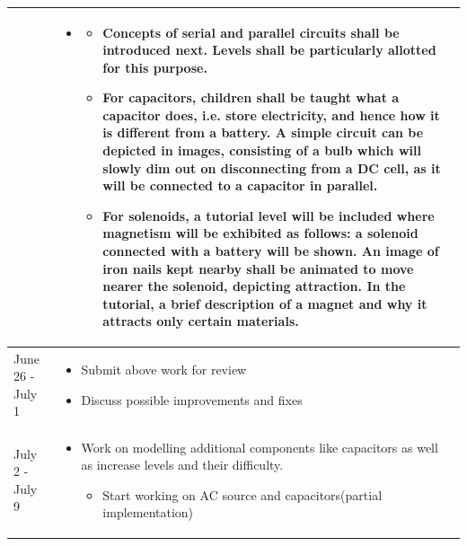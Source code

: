 \documentclass[preprint,12pt]{elsarticle}
\begin{document}
\begin{center}
\begin{tabularx}{\linewidth}{|l|X|}
  & \par
\parbox{12cm}{
\begin{itemize}[noitemsep, topsep=2pt]
	\item[] 
	\begin{itemize}[noitemsep, topsep=2pt]
		
		\item Concepts of serial and parallel circuits shall be introduced next. Levels shall be particularly allotted for this purpose.
		
		\item For capacitors, children shall be taught what a capacitor does, i.e. store electricity, and hence how it is different from  a battery. A simple circuit can be depicted in images, consisting of a bulb which will slowly dim out on disconnecting from a DC cell, as it will be connected to a capacitor in parallel.

		\item For solenoids, a tutorial level will be included where magnetism will be exhibited as follows: a solenoid connected with a battery will be shown. An image of iron nails kept nearby shall be animated to move nearer the solenoid, depicting attraction. In the tutorial, a brief description of a magnet and why it attracts only certain materials.
		\end{itemize}
	\end{itemize}	 
 }\\
 \hline

{June 26 - July 1} & \par
\parbox{12cm}{
\begin{itemize}[noitemsep, topsep=2pt]
	\item Submit above work for review
	\item Discuss possible improvements and fixes
\end{itemize}
}\\
\hline

{July 2 - July 9} & \par
\parbox{12cm}{
\begin{itemize}[noitemsep, topsep=2pt]
	\item Work on modelling additional components like capacitors as well as increase levels and their difficulty.
	
	\begin{itemize}
		\item Start working on AC source and capacitors(partial implementation)
	\end{itemize}
\end{itemize}
}\\
\hline\hline


\end{tabularx}
\end{center}
\end{document}
